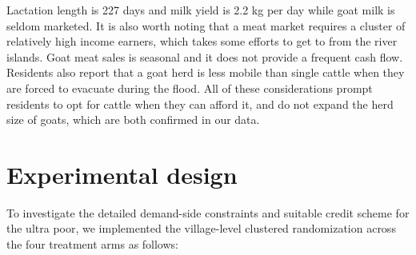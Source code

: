 	Lactation length is 227 days and milk yield is 2.2 kg per day \citep{Rokonuzzaman2009} while goat milk is seldom marketed. It is also worth noting that a meat market requires a cluster of relatively high income earners, which takes some efforts to get to from the river islands. Goat meat sales is seasonal and it does not provide a frequent cash flow. Residents also report that a goat herd is less mobile than single cattle when they are forced to evacuate during the flood. All of these considerations prompt residents to opt for cattle when they can afford it, and do not expand the herd size of goats, which are both confirmed in our data.

\section{Experimental design}
\label{SecExperimentalDesign}



	To investigate the detailed demand-side constraints and suitable credit scheme for the ultra poor, we implemented the village-level clustered randomization across the four treatment arms as follows:

